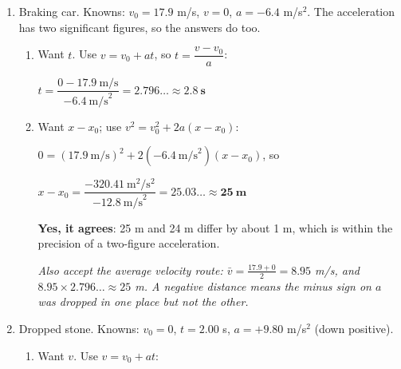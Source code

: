 \documentclass[12pt, twoside]{article}
\begin{document}
\begin{enumerate}[itemsep=0.5cm]
\begin{enumerate}[itemsep=0.3cm]
      Step 2, convert, carrying the unrounded value:

      $10.438\ldots~\dfrac{\text{m}}{\text{s}} \times
      \dfrac{3600~\text{s}}{1~\text{h}} \times \dfrac{1~\text{km}}{1000~\text{m}}
      = 37.578\ldots \approx \mathbf{37.6~\textbf{km/h}}$

      \emph{Also accept $\times 3.6$ in Step 2. Rounding first, $10.4 \times 3.6 =
      37.44 \approx 37.4$ km/h, loses the third figure --- the reason to carry
      $10.438\ldots$}
    \item 12.3 m/s is an \textbf{instantaneous} speed. \textbf{He starts from rest},
      and the first few seconds are spent speeding up, so the average over the whole
      race is lower than the top speed.

      \emph{Credit any answer that names the start from rest (the acceleration
      phase). Also accept that he eases off slightly at the end.}
  \end{enumerate}

\item Braking car. Knowns: $v_0 = 17.9$ m/s, $v = 0$, $a = -6.4$ m/s$^2$. The
  acceleration has two significant figures, so the answers do too.
  \begin{enumerate}[itemsep=0.3cm]
    \item Want $t$. Use $v = v_0 + at$, so $t = \dfrac{v - v_0}{a}$:

      $t = \dfrac{0 - 17.9~\text{m/s}}{-6.4~\text{m/s}^2} = 2.796\ldots
      \approx \mathbf{2.8~\textbf{s}}$
    \item Want $x - x_0$; use $v^2 = v_0^2 + 2a(x - x_0)$:

      $0 = (17.9~\text{m/s})^2 + 2(-6.4~\text{m/s}^2)(x - x_0)$, \quad so

      $x - x_0 = \dfrac{-320.41~\text{m}^2/\text{s}^2}{-12.8~\text{m/s}^2}
      = 25.03\ldots \approx \mathbf{25~\textbf{m}}$

      \textbf{Yes, it agrees}: 25 m and 24 m differ by about 1 m, which is within
      the precision of a two-figure acceleration.

      \emph{Also accept the average velocity route: $\bar{v} = \frac{17.9 + 0}{2}
      = 8.95$ m/s, and $8.95 \times 2.796\ldots \approx 25$ m. A negative distance
      means the minus sign on $a$ was dropped in one place but not the other.}
  \end{enumerate}

\item Dropped stone. Knowns: $v_0 = 0$, $t = 2.00$ s, $a = +9.80$ m/s$^2$ (down
  positive).
  \begin{enumerate}[itemsep=0.3cm]
    \item Want $v$. Use $v = v_0 + at$:


\end{enumerate}
\end{enumerate}
\end{document}
